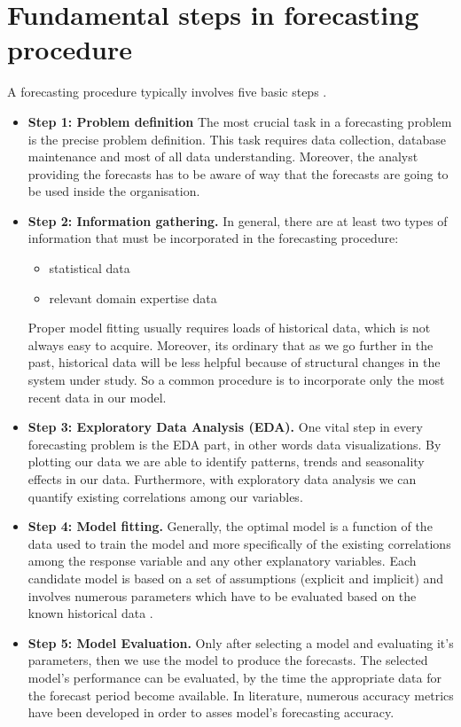 \section{Fundamental steps in forecasting procedure}
A forecasting procedure typically involves five basic steps \cite{larose2014discovering}.\\
\begin{itemize}
\item \textbf{Step 1: Problem definition}
The most crucial task in a forecasting problem is the precise problem definition. This task requires data collection, database maintenance and most of all data understanding. Moreover, the analyst providing the forecasts has to be aware of way that the forecasts are going to be used inside the organisation.\\

\item \textbf{Step 2: Information gathering.}
In general, there are at least two types of information that must be incorporated in the forecasting procedure: 
\begin{itemize}
    \item statistical data
    \item relevant domain expertise data
\end{itemize} 
Proper model fitting usually requires loads of historical data, which is not always easy to acquire. Moreover, its ordinary that as we go further in the past, historical data will be less helpful because of structural changes in the system under study. So a common procedure is to incorporate only the most recent data in our model. \\
\item \textbf{Step 3: Exploratory Data Analysis (EDA).}
One vital step in every forecasting problem is the EDA part, in other words data visualizations. By plotting our data we are able to identify patterns, trends and seasonality effects in our data. Furthermore, with exploratory data analysis we can quantify existing correlations among our variables. \\

\item \textbf{Step 4: Model fitting.}
Generally, the optimal model is a function of the data used to train the model and more specifically of the existing correlations among the response variable and any other explanatory variables. Each candidate model is based on a set of assumptions (explicit and implicit) and involves numerous parameters which have to be evaluated based on the known historical data \cite{montgomery2015introduction}.

\item \textbf{Step 5: Model Evaluation.}
Only after selecting a model and evaluating it's parameters, then we use the model to produce the forecasts. The selected model's performance can be evaluated, by the time the appropriate data for the forecast period become available. In literature, numerous accuracy metrics have been developed in order to asses model's forecasting accuracy.
\end{itemize}

